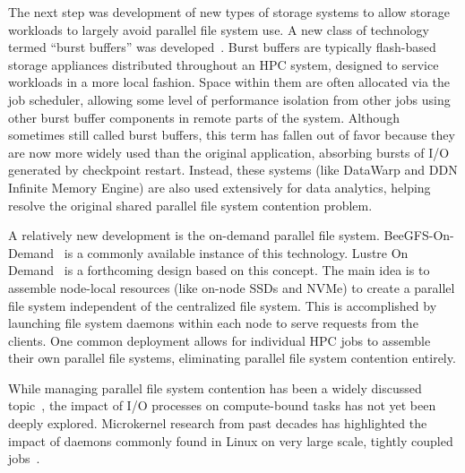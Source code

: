 The next step was development of new types of storage systems to allow storage workloads to largely avoid parallel file system use. A new class of technology termed ``burst buffers'' was developed~\cite{burstbuffers}. Burst buffers are typically flash-based storage appliances distributed throughout an HPC system, designed to service workloads in a more local fashion. Space within them are often allocated via the job scheduler, allowing some level of performance isolation from other jobs using other burst buffer components in remote parts of the system. Although sometimes still called burst buffers, this term has fallen out of favor because they are now more widely used than the original application, absorbing bursts of I/O generated by checkpoint restart. Instead, these systems (like DataWarp and DDN Infinite Memory Engine) are also used extensively for data analytics, helping resolve the original shared parallel file system contention problem.

A relatively new development is the on-demand parallel file system. BeeGFS-On-Demand~\cite{beeond} is a commonly available instance of this technology. Lustre On Demand~\cite{lustre-on-demand} is a forthcoming design based on this concept. The main idea is to assemble node-local resources (like on-node SSDs and NVMe) to create a parallel file system independent of the centralized file system. This is accomplished by launching file system daemons within each node to serve requests from the clients. One common deployment allows for individual HPC jobs to assemble their own parallel file systems, eliminating parallel file system contention entirely.

While managing parallel file system contention has been a widely discussed topic~\cite{managing-contention}, the impact of I/O processes on compute-bound tasks has not yet been deeply explored. Microkernel research from past decades has highlighted the impact of daemons commonly found in Linux on very large scale, tightly coupled jobs~\cite{daemon-interference}. 
